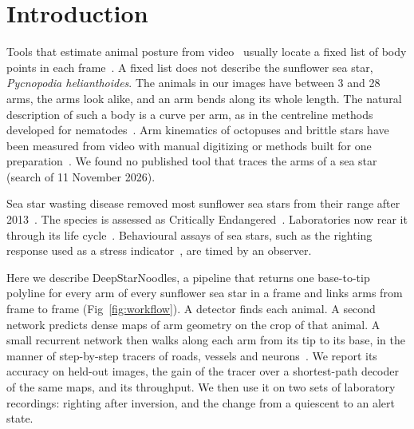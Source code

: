 \section*{Introduction}

Tools that estimate animal posture from video~\cite{anderson2014toward,pereira2020quantifying} usually locate a fixed list of body points in each frame~\cite{mathis2018deeplabcut,pereira2022sleap,lauer2022multianimal}.
A fixed list does not describe the sunflower sea star, \textit{Pycnopodia helianthoides}.
The animals in our images have between 3 and 28 arms, the arms look alike, and an arm bends along its whole length.
The natural description of such a body is a curve per arm, as in the centreline methods developed for nematodes~\cite{stephens2008dimensionality,javer2018opensource,hebert2021wormpose}.
Arm kinematics of octopuses and brittle stars have been measured from video with manual digitizing or methods built for one preparation~\cite{yekutieli2007analyzing,kennedy2020octopus,goharimanesh2023methodological}.
We found no published tool that traces the arms of a sea star (search of 11 November 2026).

Sea star wasting disease removed most sunflower sea stars from their range after 2013~\cite{montecinolatorre2016devastating,harvell2019disease,hamilton2021disease}.
The species is assessed as Critically Endangered~\cite{gravem2021pycnopodia}.
Laboratories now rear it through its life cycle~\cite{hodin2021progress}.
Behavioural assays of sea stars, such as the righting response used as a stress indicator~\cite{polls1975behavioral,lawrence1996righting}, are timed by an observer.

Here we describe DeepStarNoodles, a pipeline that returns one base-to-tip polyline for every arm of every sunflower sea star in a frame and links arms from frame to frame (Fig~\ref{fig:workflow}).
A detector finds each animal.
A second network predicts dense maps of arm geometry on the crop of that animal.
A small recurrent network then walks along each arm from its tip to its base, in the manner of step-by-step tracers of roads, vessels and neurons~\cite{bastani2018roadtracer,wolterink2019coronary,januszewski2018highprecision}.
We report its accuracy on held-out images, the gain of the tracer over a shortest-path decoder of the same maps, and its throughput.
We then use it on two sets of laboratory recordings: righting after inversion, and the change from a quiescent to an alert state.

